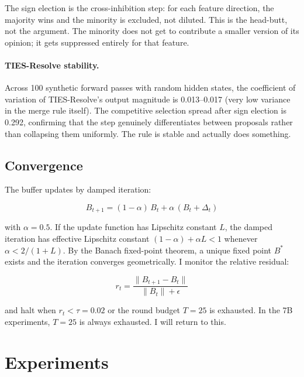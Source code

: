 \documentclass[10pt,twocolumn]{article}
\begin{document}
The sign election is the cross-inhibition step: for each feature direction, the majority wins and the minority is excluded, not diluted. This is the head-butt, not the argument. The minority does not get to contribute a smaller version of its opinion; it gets suppressed entirely for that feature.

\paragraph{TIES-Resolve stability.}
Across 100 synthetic forward passes with random hidden states, the coefficient of variation of TIES-Resolve's output magnitude is 0.013--0.017 (very low variance in the merge rule itself). The competitive selection spread after sign election is 0.292, confirming that the step genuinely differentiates between proposals rather than collapsing them uniformly. The rule is stable and actually does something.

\subsection{Convergence}

The buffer updates by damped iteration:

\begin{equation}
    B_{t+1} = (1 - \alpha)\, B_t + \alpha\, (B_t + \Delta_t)
    \label{eq:damped_update}
\end{equation}

with $\alpha = 0.5$. If the update function has Lipschitz constant $L$, the damped iteration has effective Lipschitz constant $(1-\alpha) + \alpha L < 1$ whenever $\alpha < 2/(1+L)$. By the Banach fixed-point theorem, a unique fixed point $B^*$ exists and the iteration converges geometrically. I monitor the relative residual:

\begin{equation}
    r_t = \frac{\|B_{t+1} - B_t\|}{\|B_t\| + \epsilon}
    \label{eq:residual}
\end{equation}

and halt when $r_t < \tau = 0.02$ or the round budget $T = 25$ is exhausted. In the 7B experiments, $T = 25$ is always exhausted. I will return to this.

\section{Experiments}
\label{sec:experiments}
\end{document}
